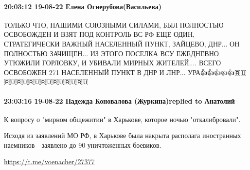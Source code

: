 \paragraph{20:03:12 19-08-22 Елена Огнерубова(Васильева)}

ТОЛЬКО ЧТО, НАШИМИ СОЮЗНЫМИ СИЛАМИ, БЫЛ ПОЛНОСТЬЮ ОСВОБОЖДЕН И ВЗЯТ ПОД
КОНТРОЛЬ ВС РФ ЕЩЕ ОДИН, СТРАТЕГИЧЕСКИ ВАЖНЫЙ НАСЕЛЕННЫЙ ПУНКТ, ЗАЙЦЕВО, ДНР...
ОН ПОЛНОСТЬЮ ЗАЧИЩЕН... ИЗ ЭТОГО ПОСЕЛКА ВСУ ЕЖЕДНЕВНО УТЮЖИЛИ ГОРЛОВКУ, И
УБИВАЛИ МИРНЫХ ЖИТЕЛЕЙ.... ВСЕГО ОСВОБОЖЕН 271 НАСЕЛЕННЫЙ ПУНКТ В ДНР И ЛНР...
УРА👍👍👍👍👍🇷🇺🇷🇺🇷🇺🇷🇺🇷🇺🇷🇺🇷🇺🇷🇺

\paragraph{23:03:16 19-08-22 Надежда Коновалова (Журкина)replied to Анатолий}

К вопросу о "мирном общежитии" в Харькове, которое ночью "откалибровали".

Исходя из заявлений МО РФ, в Харькове была накрыта располага иностранных
наемников - заявлено до 90 уничтоженных боевиков.

\url{https://t.me/voenacher/27377}


